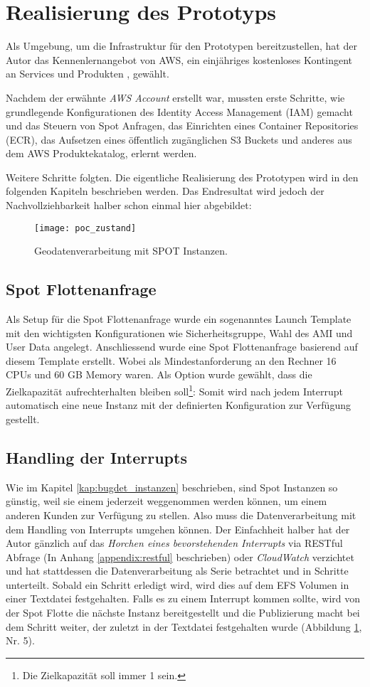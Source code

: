 \section{Realisierung des Prototyps}
Als Umgebung, um die Infrastruktur für den Prototypen bereitzustellen, hat der Autor das Kennenlernangebot von AWS, ein einjähriges kostenloses Kontingent an Services und Produkten \cite{FreeTier2020}, gewählt.

Nachdem der erwähnte \emph{AWS Account} erstellt war, mussten erste Schritte, wie grundlegende Konfigurationen des Identity Access Management (IAM) gemacht und das Steuern von Spot Anfragen, das Einrichten eines Container Repositories (ECR), das Aufsetzen eines öffentlich zugänglichen S3 Buckets und anderes aus dem AWS Produktekatalog, erlernt werden.

Weitere Schritte folgten. Die eigentliche Realisierung des Prototypen wird in den folgenden Kapiteln beschrieben werden. Das Endresultat wird jedoch der Nachvollziehbarkeit halber schon einmal hier abgebildet:

\begin{figure}[H]
	\centering
	\texttt{[image: poc\_zustand]}
	\caption{Geodatenverarbeitung mit SPOT Instanzen.}
	\label{fig:ist_zustand}
\end{figure}

\subsection{Spot Flottenanfrage}
Als Setup für die Spot Flottenanfrage wurde ein sogenanntes Launch Template mit den wichtigsten Konfigurationen wie Sicherheitsgruppe, Wahl des AMI und User Data angelegt. Anschliessend wurde eine Spot Flottenanfrage basierend auf diesem Template erstellt. Wobei als Mindestanforderung an den Rechner 16 CPUs und 60 GB Memory waren. Als Option wurde gewählt, dass die Zielkapazität aufrechterhalten bleiben soll\footnote{Die Zielkapazität soll immer 1 sein.}: Somit wird nach jedem Interrupt automatisch eine neue Instanz mit der definierten Konfiguration zur Verfügung gestellt.

\subsection{Handling der Interrupts}
Wie im Kapitel \ref{kap:bugdet_instanzen} beschrieben, sind Spot Instanzen so günstig, weil sie einem jederzeit weggenommen werden können, um einem anderen Kunden zur Verfügung zu stellen. Also muss die Datenverarbeitung mit dem Handling von Interrupts umgehen können. 
Der Einfachheit halber hat der Autor gänzlich auf das \textit{Horchen eines bevorstehenden Interrupts} via RESTful Abfrage (In Anhang \ref{appendix:restful} beschrieben) oder \emph{CloudWatch} verzichtet und hat stattdessen die Datenverarbeitung als Serie betrachtet und in Schritte unterteilt. Sobald ein Schritt erledigt wird, wird dies auf dem EFS Volumen in einer Textdatei festgehalten. Falls es zu einem Interrupt kommen sollte, wird von der Spot Flotte die nächste Instanz bereitgestellt und die Publizierung macht bei dem Schritt weiter, der zuletzt in der Textdatei festgehalten wurde (Abbildung \ref{fig:ist_zustand}, Nr. 5).

